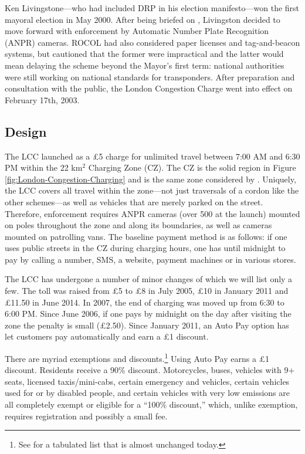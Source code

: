 Ken Livingstone---who had included DRP in his election manifesto---won the first mayoral election in May 2000. After being briefed on \citet{ROCOL2000}, Livingston decided to move forward with enforcement by Automatic Number Plate Recognition (ANPR) cameras. ROCOL had also considered paper licenses and tag-and-beacon systems, but cautioned that the former were impractical and the latter would mean delaying the scheme beyond the Mayor's first term: national authorities were still working on national standards for transponders. After preparation and consultation with the public, the London Congestion Charge went into effect on February 17th, 2003.

\subsection{Design}

The LCC launched as a \pounds5 charge for unlimited travel between 7:00 AM and 6:30 PM within the 22 km$^{2}$ Charging Zone (CZ). The CZ is the solid region in Figure \ref{fig:London-Congestion-Charging} and is the same zone considered by \citet{Thomson1967a}. Uniquely, the LCC covers all travel within the zone---not just traversals of a cordon like the other schemes---as well as vehicles that are merely parked on the street. Therefore, enforcement requires ANPR cameras (over 500 at the launch) mounted on poles throughout the zone and along its boundaries, as well as cameras mounted on patrolling vans. The baseline payment method is as follows: if one uses public streets in the CZ during charging hours, one has until midnight to pay by calling a number, SMS, a website, payment machines or in various stores. 

The LCC has undergone a number of minor changes of which we will list only a few. The toll was raised from \pounds5 to \pounds8 in July 2005, \pounds10 in January 2011 and \pounds11.50 in June 2014. In 2007, the end of charging was moved up from 6:30 to 6:00 PM. Since June 2006, if one pays by midnight on the day after visiting the zone the penalty is small (\pounds 2.50). Since January 2011, an Auto Pay option has let customers pay automatically and earn a \pounds 1 discount.

There are myriad exemptions and discounts.\footnote{See \citet[Table 1, p. 515]{Santos2005} for a tabulated list that is almost unchanged today.} Using Auto Pay earns a \pounds1 discount. Residents receive a 90\% discount. Motorcycles, buses, vehicles with 9+ seats, licensed taxis/mini-cabs, certain emergency and vehicles, certain vehicles used for or by  disabled people, and certain vehicles with very low emissions are all completely exempt or eligible for a ``100\% discount,'' which, unlike exemption, requires registration and possibly a small fee.

